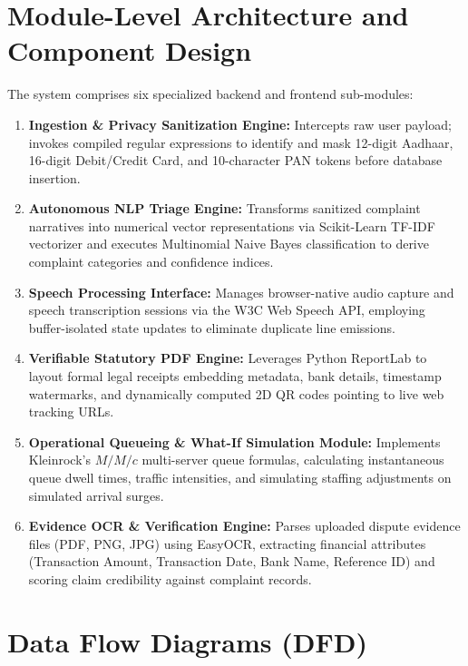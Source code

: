 \section{Module-Level Architecture and Component Design}
The system comprises six specialized backend and frontend sub-modules:
\begin{enumerate}
    \item \textbf{Ingestion \& Privacy Sanitization Engine:} Intercepts raw user payload; invokes compiled regular expressions to identify and mask 12-digit Aadhaar, 16-digit Debit/Credit Card, and 10-character PAN tokens before database insertion.
    \item \textbf{Autonomous NLP Triage Engine:} Transforms sanitized complaint narratives into numerical vector representations via Scikit-Learn TF-IDF vectorizer and executes Multinomial Naive Bayes classification to derive complaint categories and confidence indices.
    \item \textbf{Speech Processing Interface:} Manages browser-native audio capture and speech transcription sessions via the W3C Web Speech API, employing buffer-isolated state updates to eliminate duplicate line emissions.
    \item \textbf{Verifiable Statutory PDF Engine:} Leverages Python ReportLab to layout formal legal receipts embedding metadata, bank details, timestamp watermarks, and dynamically computed 2D QR codes pointing to live web tracking URLs.
    \item \textbf{Operational Queueing \& What-If Simulation Module:} Implements Kleinrock's $M/M/c$ multi-server queue formulas, calculating instantaneous queue dwell times, traffic intensities, and simulating staffing adjustments on simulated arrival surges.
    \item \textbf{Evidence OCR \& Verification Engine:} Parses uploaded dispute evidence files (PDF, PNG, JPG) using EasyOCR, extracting financial attributes (Transaction Amount, Transaction Date, Bank Name, Reference ID) and scoring claim credibility against complaint records.
\end{enumerate}

\section{Data Flow Diagrams (DFD)}
